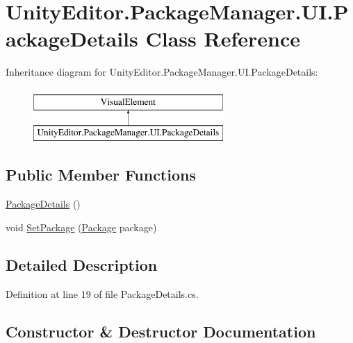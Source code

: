 \hypertarget{class_unity_editor_1_1_package_manager_1_1_u_i_1_1_package_details}{}\section{Unity\+Editor.\+Package\+Manager.\+U\+I.\+Package\+Details Class Reference}
\label{class_unity_editor_1_1_package_manager_1_1_u_i_1_1_package_details}
Inheritance diagram for Unity\+Editor.\+Package\+Manager.\+U\+I.\+Package\+Details\+:\begin{figure}[H]
\begin{center}
\leavevmode
\includegraphics[height=2.000000cm]{class_unity_editor_1_1_package_manager_1_1_u_i_1_1_package_details}
\end{center}
\end{figure}
\subsection*{Public Member Functions}
\begin{DoxyCompactItemize}
\item 
\mbox{\hyperlink{class_unity_editor_1_1_package_manager_1_1_u_i_1_1_package_details_a18b3270e141ee9096253d8e9955ea8b0}{Package\+Details}} ()
\item 
void \mbox{\hyperlink{class_unity_editor_1_1_package_manager_1_1_u_i_1_1_package_details_a712f501a6f645d732641337a9e3c5654}{Set\+Package}} (\mbox{\hyperlink{class_unity_editor_1_1_package_manager_1_1_u_i_1_1_package}{Package}} package)
\end{DoxyCompactItemize}


\subsection{Detailed Description}


Definition at line 19 of file Package\+Details.\+cs.



\subsection{Constructor \& Destructor Documentation}
\mbox{\label{class_unity_editor_1_1_package_manager_1_1_u_i_1_1_package_details_a18b3270e141ee9096253d8e9955ea8b0}} 
